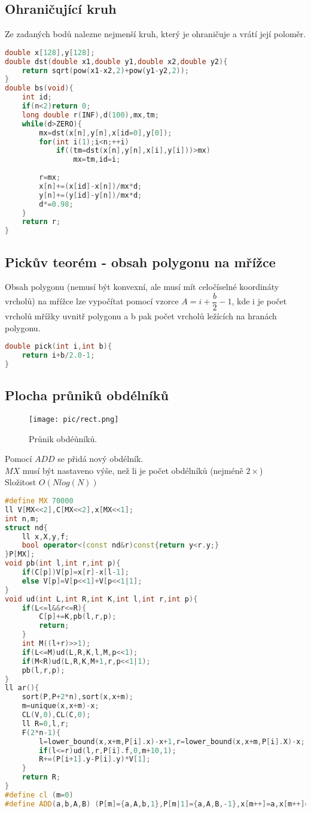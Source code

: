 \documentclass[11pt]{article}
\begin{document}
\subsection{Ohraničující kruh}
Ze zadaných bodů nalezne nejmenší kruh, který je ohraničuje a vrátí její poloměr.
\begin{lstlisting}[language=C++]
double x[128],y[128];
double dst(double x1,double y1,double x2,double y2){
    return sqrt(pow(x1-x2,2)+pow(y1-y2,2));
}
double bs(void){
	int id;
    if(n<2)return 0;
    long double r(INF),d(100),mx,tm;
    while(d>ZERO){
        mx=dst(x[n],y[n],x[id=0],y[0]);
        for(int i(1);i<n;++i)
            if((tm=dst(x[n],y[n],x[i],y[i]))>mx)
                mx=tm,id=i;
        
        r=mx;
        x[n]+=(x[id]-x[n])/mx*d;
        y[n]+=(y[id]-y[n])/mx*d;
        d*=0.98;
    }
    return r;
}
\end{lstlisting}
\subsection{Pickův teorém - obsah polygonu na mřížce}
Obsah polygonu (nemusí být konvexní, ale musí mít celočíselné koordináty vrcholů) na mřížce lze vypočítat pomocí vzorce $A=i+\dfrac{b}{2}-1$, kde i je počet vrcholů mřížky uvnitř polygonu a b pak počet vrcholů ležících na hranách polygonu.
\begin{lstlisting}[language=C++]
double pick(int i,int b){
    return i+b/2.0-1;
}
\end{lstlisting}
\subsection{Plocha průniků obdélníků}
\begin{figure}[H]
  \centering
  \texttt{[image: pic/rect.png]}
  \caption[Průnik obdélníků.]{Průnik obdéůníků.}
\end{figure}
Pomocí $ADD$ se přidá nový obdélník.
\\$MX$ musí být nastaveno výše, než li je počet obdélníků (nejméně $2\times$)
\\Složitost $O(Nlog(N))$
\begin{lstlisting}[language=C++]
#define MX 70000
ll V[MX<<2],C[MX<<2],x[MX<<1];
int n,m;
struct nd{
    ll x,X,y,f;
    bool operator<(const nd&r)const{return y<r.y;}
}P[MX];
void pb(int l,int r,int p){
    if(C[p])V[p]=x[r]-x[l-1];
    else V[p]=V[p<<1]+V[p<<1|1];
}
void ud(int L,int R,int K,int l,int r,int p){
    if(L<=l&&r<=R){
        C[p]+=K,pb(l,r,p);
        return;
    }
    int M((l+r)>>1);
    if(L<=M)ud(L,R,K,l,M,p<<1);
    if(M<R)ud(L,R,K,M+1,r,p<<1|1);
    pb(l,r,p);
}
ll ar(){
    sort(P,P+2*n),sort(x,x+m);
    m=unique(x,x+m)-x;
    CL(V,0),CL(C,0);
    ll R=0,l,r;
    F(2*n-1){
        l=lower_bound(x,x+m,P[i].x)-x+1,r=lower_bound(x,x+m,P[i].X)-x;
        if(l<=r)ud(l,r,P[i].f,0,m+10,1);
        R+=(P[i+1].y-P[i].y)*V[1];
    }
    return R;
}
#define cl (m=0)
#define ADD(a,b,A,B) (P[m]={a,A,b,1},P[m|1]={a,A,B,-1},x[m++]=a,x[m++]=A)
\end{lstlisting}
\end{document}
